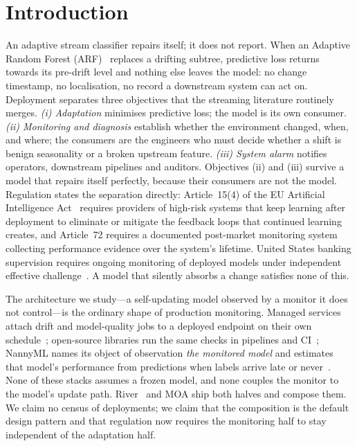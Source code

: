 \section{Introduction}\label{sec:intro}

An adaptive stream classifier repairs itself; it does not report.
When an Adaptive Random Forest (ARF)~\cite{gomes_arf_2017} replaces a drifting
subtree, predictive loss returns towards its pre-drift level and nothing else
leaves the model: no change timestamp, no localisation, no record a downstream
system can act on. Deployment separates three objectives that the streaming
literature routinely merges.
\emph{(i) Adaptation} minimises predictive loss; the model is its own consumer.
\emph{(ii) Monitoring and diagnosis} establish whether the environment changed,
when, and where; the consumers are the engineers who must decide whether a shift
is benign seasonality or a broken upstream feature.
\emph{(iii) System alarm} notifies operators, downstream pipelines and auditors.
Objectives (ii) and (iii) survive a model that repairs itself perfectly, because
their consumers are not the model. Regulation states the separation directly:
Article~15(4) of the EU Artificial Intelligence Act~\cite{eu_ai_act_2024}
requires providers of high-risk systems that keep learning after deployment to
eliminate or mitigate the feedback loops that continued learning creates, and
Article~72 requires a documented post-market monitoring system collecting
performance evidence over the system's lifetime. United States banking
supervision requires ongoing monitoring of deployed models under independent
effective challenge~\cite{frb_sr26_2_2026}. A model that silently absorbs a
change satisfies none of this.

The architecture we study---a self-updating model observed by a monitor it does
not control---is the ordinary shape of production monitoring. Managed services
attach drift and model-quality jobs to a deployed endpoint on their own
schedule~\cite{gcp_vertex_monitoring, aws_model_monitor}; open-source libraries
run the same checks in pipelines and CI~\cite{evidently_lib}; NannyML names its
object of observation \emph{the monitored model} and estimates that model's
performance from predictions when labels arrive late or never~\cite{nannyml_pe}.
None of these stacks assumes a frozen model, and none couples the monitor to the
model's update path. River~\cite{montiel_river_2021} and MOA ship both halves and
compose them. We claim no census of deployments; we claim that the composition is
the default design pattern and that regulation now requires the monitoring half
to stay independent of the adaptation half.

